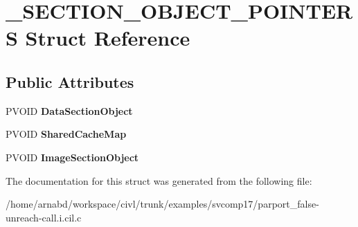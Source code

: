 \hypertarget{struct__SECTION__OBJECT__POINTERS}{}\section{\+\_\+\+S\+E\+C\+T\+I\+O\+N\+\_\+\+O\+B\+J\+E\+C\+T\+\_\+\+P\+O\+I\+N\+T\+E\+R\+S Struct Reference}
\label{struct__SECTION__OBJECT__POINTERS}
\subsection*{Public Attributes}
\begin{DoxyCompactItemize}
\item 
\hypertarget{struct__SECTION__OBJECT__POINTERS_a8e44f59a3114959b946420283f12b0b0}{}P\+V\+O\+I\+D {\bfseries Data\+Section\+Object}\label{struct__SECTION__OBJECT__POINTERS_a8e44f59a3114959b946420283f12b0b0}

\item 
\hypertarget{struct__SECTION__OBJECT__POINTERS_a96c5b886cac29fcb7d6eb44164e482f2}{}P\+V\+O\+I\+D {\bfseries Shared\+Cache\+Map}\label{struct__SECTION__OBJECT__POINTERS_a96c5b886cac29fcb7d6eb44164e482f2}

\item 
\hypertarget{struct__SECTION__OBJECT__POINTERS_a146a6e8b8b7d820a476c1d60b0c330a2}{}P\+V\+O\+I\+D {\bfseries Image\+Section\+Object}\label{struct__SECTION__OBJECT__POINTERS_a146a6e8b8b7d820a476c1d60b0c330a2}

\end{DoxyCompactItemize}


The documentation for this struct was generated from the following file\+:\begin{DoxyCompactItemize}
\item 
/home/arnabd/workspace/civl/trunk/examples/svcomp17/parport\+\_\+false-\/unreach-\/call.\+i.\+cil.\+c\end{DoxyCompactItemize}
